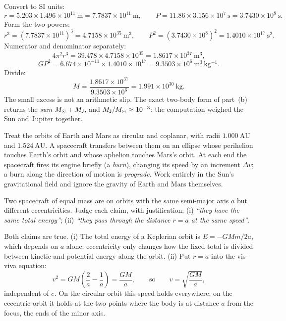 \begin{solution}
Convert to SI units:
\[
  r = 5.203 \times 1.496 \times 10^{11}\ \mathrm{m} = 7.7837 \times 10^{11}\ \mathrm{m},
  \qquad
  P = 11.86 \times 3.156 \times 10^{7}\ \mathrm{s} = 3.7430 \times 10^{8}\ \mathrm{s}.
\]
Form the two powers:
\[
  r^3 = (7.7837 \times 10^{11})^3 = 4.7158 \times 10^{35}\ \mathrm{m^3},
  \qquad
  P^2 = (3.7430 \times 10^{8})^2 = 1.4010 \times 10^{17}\ \mathrm{s^2}.
\]
Numerator and denominator separately:
\[
  4\pi^2 r^3 = 39.478 \times 4.7158 \times 10^{35} = 1.8617 \times 10^{37}\ \mathrm{m^3},
\]
\[
  G P^2 = 6.674 \times 10^{-11} \times 1.4010 \times 10^{17}
        = 9.3503 \times 10^{6}\ \mathrm{m^3\,kg^{-1}}.
\]
Divide:
\[
  M = \frac{1.8617 \times 10^{37}}{9.3503 \times 10^{6}} = 1.991 \times 10^{30}\ \mathrm{kg}.
\]
The small excess is not an arithmetic slip. The exact two-body form of part~(b) returns the
\emph{sum} $M_{\odot} + M_{\mathsf{J}}$, and $M_{\mathsf{J}}/M_{\odot} \approx 10^{-3}$: the computation weighed the Sun
and Jupiter together.

\end{solution}



Treat the orbits of Earth and Mars as circular and coplanar, with radii $1.000\ \mathrm{AU}$ and
$1.524\ \mathrm{AU}$. A spacecraft transfers between them on an ellipse whose perihelion touches
Earth's orbit and whose aphelion touches Mars's orbit. At each end the spacecraft fires its engine
briefly (a \emph{burn}), changing its speed by an increment $\Delta v$; a burn along the direction
of motion is \emph{prograde}. Work entirely in the Sun's gravitational field and ignore the
gravity of Earth and Mars themselves.

\parti Two spacecraft of equal mass are on orbits with the same semi-major axis $a$ but different
eccentricities. Judge each claim, with justification: (i) \emph{``they have the same total
energy''}; (ii) \emph{``they pass through the distance $r = a$ at the same speed''}.

\begin{solution}
Both claims are true. (i) The total energy of a Keplerian orbit is $E = -GMm/2a$, which depends
on $a$ alone; eccentricity only changes how the fixed total is divided between kinetic and
potential energy along the orbit. (ii) Put $r = a$ into the vis-viva equation:
\[
  v^2 = GM\left(\frac{2}{a} - \frac{1}{a}\right) = \frac{GM}{a},
  \qquad\text{so}\qquad
  v = \sqrt{\frac{GM}{a}},
\]
independent of $e$. On the circular orbit this speed holds everywhere; on the eccentric orbit it
holds at the two points where the body is at distance $a$ from the focus, the ends of the minor
axis.
\end{solution}

